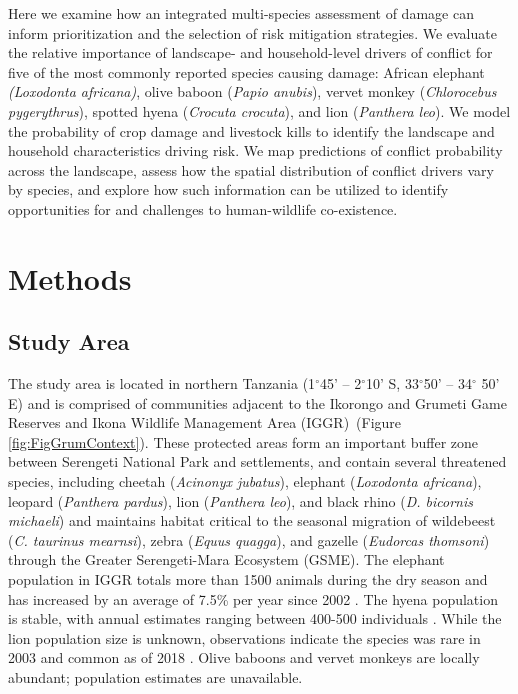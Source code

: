 \documentclass[12pt,]{article}
\begin{document}
Here we examine how an integrated multi-species assessment of damage can inform prioritization and the selection of risk mitigation strategies. We evaluate the relative importance of landscape- and household-level drivers of conflict for five of the most commonly reported species causing damage: African elephant \textit{(Loxodonta africana)}, olive baboon (\textit{Papio anubis}), vervet monkey (\textit{Chlorocebus pygerythrus}), spotted hyena (\textit{Crocuta crocuta}), and lion (\textit{Panthera leo}). We model the probability of crop damage and livestock kills to identify the landscape and household characteristics driving risk. We map predictions of conflict probability across the landscape, assess how the spatial distribution of conflict drivers vary by species, and explore how such information can be utilized to identify opportunities for and challenges to human-wildlife co-existence.





\section{Methods}
\subsection{Study Area}

The study area is located in northern Tanzania (1$^{\circ}$45’ – 2$^{\circ}$10’ S, 33$^{\circ}$50’ – 34$^{\circ}$ 50’ E) and is comprised of communities adjacent to the Ikorongo and Grumeti Game Reserves and Ikona Wildlife Management Area (IGGR)~(Figure \ref{fig:FigGrumContext}). These protected areas form an important buffer zone between Serengeti National Park and settlements, and contain several threatened species, including cheetah (\textit{Acinonyx jubatus}), elephant (\textit{Loxodonta africana}), leopard (\textit{Panthera pardus}), lion (\textit{Panthera leo}), and black rhino (\textit{D. bicornis michaeli}) and maintains habitat critical to the seasonal migration of wildebeest (\textit{C. taurinus mearnsi}), zebra (\textit{Equus quagga}), and gazelle (\textit{Eudorcas thomsoni}) through the Greater Serengeti-Mara Ecosystem (GSME). The elephant population in IGGR totals more than 1500 animals during the dry season and has increased by an average of 7.5\% per year since 2002 \citep{Goodman2018}. The hyena population is stable, with annual estimates ranging between 400-500 individuals \citep{Goodman2018}. While the lion population size is unknown, observations indicate the species was rare in 2003 and common as of 2018 \citep{Goodman2018}. Olive baboons and vervet monkeys are locally abundant; population estimates are unavailable.
\end{document}
